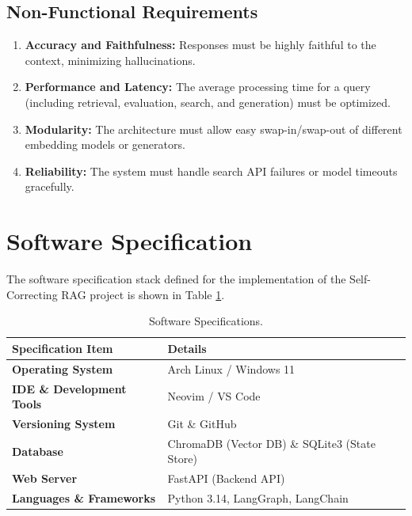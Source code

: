 \documentclass[12pt,a4paper]{article}
\begin{document}
\subsection{Non-Functional Requirements}
\begin{enumerate}
    \item \textbf{Accuracy and Faithfulness:} Responses must be highly faithful to the context, minimizing hallucinations.
    \item \textbf{Performance and Latency:} The average processing time for a query (including retrieval, evaluation, search, and generation) must be optimized.
    \item \textbf{Modularity:} The architecture must allow easy swap-in/swap-out of different embedding models or generators.
    \item \textbf{Reliability:} The system must handle search API failures or model timeouts gracefully.
\end{enumerate}

\newpage

\section{Software Specification}
The software specification stack defined for the implementation of the Self-Correcting RAG project is shown in Table \ref{tab:software_specs}.

\begin{table}[h!]
    \centering
    \small
    \begin{tabularx}{\textwidth}{lX}
        \toprule
        \textbf{Specification Item} & \textbf{Details} \\
        \midrule
        \textbf{Operating System} & Arch Linux / Windows 11 \\
        \textbf{IDE \& Development Tools} & Neovim / VS Code \\
        \textbf{Versioning System} & Git \& GitHub \\
        \textbf{Database} & ChromaDB (Vector DB) \& SQLite3 (State Store) \\
        \textbf{Web Server} & FastAPI (Backend API) \\
        \textbf{Languages \& Frameworks} & Python 3.14, LangGraph, LangChain \\
        \bottomrule
    \end{tabularx}
    \caption{Software Specifications.}
    \label{tab:software_specs}
\end{table}
\end{document}
